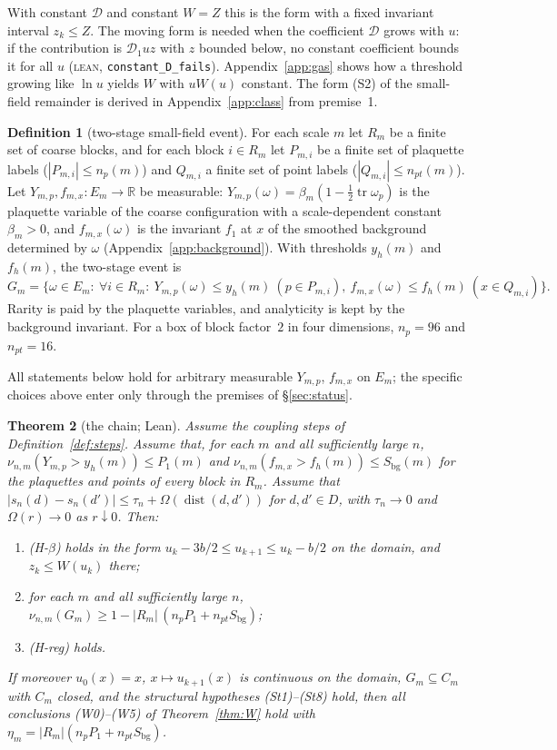\documentclass[11pt,a4paper]{article}
\newtheorem{theorem}{Theorem}[section]
\theoremstyle{definition}
\newtheorem{definition}[theorem]{Definition}
\theoremstyle{remark}
\newcommand{\tagL}{\textsc{lean}}
\newcommand{\lt}[1]{\texttt{#1}}
\begin{document}
With constant $\mathcal D$ and constant $W=Z$ this is the form with a fixed invariant interval $z_k\le Z$. The moving form is needed when the coefficient $\mathcal D$ grows with $u$: if the contribution is $\mathcal D_1uz$ with $z$ bounded below, no constant coefficient bounds it for all $u$ (\tagL, \lt{constant\_\allowbreak{}D\_\allowbreak{}fails}). Appendix~\ref{app:gas} shows how a threshold growing like $\ln u$ yields $W$ with $uW(u)$ constant. The form (S2) of the small-field remainder is derived in Appendix~\ref{app:class} from premise~1.

\begin{definition}[two-stage small-field event]\label{def:twostage}
For each scale $m$ let $R_m$ be a finite set of coarse blocks, and for each block $i\in R_m$ let $P_{m,i}$ be a finite set of plaquette labels ($|P_{m,i}|\le n_p(m)$) and $Q_{m,i}$ a finite set of point labels ($|Q_{m,i}|\le n_{pt}(m)$). Let $Y_{m,p},f_{m,x}\colon E_m\to\mathbb R$ be measurable: $Y_{m,p}(\omega)=\beta_m(1-\tfrac12\operatorname{tr}\omega_p)$ is the plaquette variable of the coarse configuration with a scale-dependent constant $\beta_m>0$, and $f_{m,x}(\omega)$ is the invariant $f_1$ at $x$ of the smoothed background determined by $\omega$ (Appendix~\ref{app:background}). With thresholds $y_h(m)$ and $f_h(m)$, the two-stage event is
\[
G_m=\bigl\{\omega\in E_m:\ \forall i\in R_m:\ Y_{m,p}(\omega)\le y_h(m)\ (p\in P_{m,i}),\ f_{m,x}(\omega)\le f_h(m)\ (x\in Q_{m,i})\bigr\}.
\]
Rarity is paid by the plaquette variables, and analyticity is kept by the background invariant. For a box of block factor~$2$ in four dimensions, $n_p=96$ and $n_{pt}=16$.
\end{definition}

All statements below hold for arbitrary measurable $Y_{m,p}$, $f_{m,x}$ on $E_m$; the specific choices above enter only through the premises of \S\ref{sec:status}.

\begin{theorem}[the chain; Lean]\label{thm:chain}
Assume the coupling steps of Definition~\ref{def:steps}. Assume that, for each $m$ and all sufficiently large $n$, $\nu_{n,m}(Y_{m,p}>y_h(m))\le P_1(m)$ and $\nu_{n,m}(f_{m,x}>f_h(m))\le S_{\mathrm{bg}}(m)$ for the plaquettes and points of every block in $R_m$. Assume that $|s_n(d)-s_n(d')|\le\tau_n+\Omega(\operatorname{dist}(d,d'))$ for $d,d'\in D$, with $\tau_n\to0$ and $\Omega(r)\to0$ as $r\downarrow0$. Then:
\begin{enumerate}[label=(\roman*),leftmargin=2.5em]
\item (H-$\beta$) holds in the form $u_k-3b/2\le u_{k+1}\le u_k-b/2$ on the domain, and $z_k\le W(u_k)$ there;
\item for each $m$ and all sufficiently large $n$, $\nu_{n,m}(G_m)\ge1-|R_m|\,(n_pP_1+n_{pt}S_{\mathrm{bg}})$;
\item (H-reg) holds.
\end{enumerate}
If moreover $u_0(x)=x$, $x\mapsto u_{k+1}(x)$ is continuous on the domain, $G_m\subseteq C_m$ with $C_m$ closed, and the structural hypotheses (St1)--(St8) hold, then all conclusions (W0)--(W5) of Theorem~\ref{thm:W} hold with $\eta_m=|R_m|(n_pP_1+n_{pt}S_{\mathrm{bg}})$.
\end{theorem}
\end{document}
